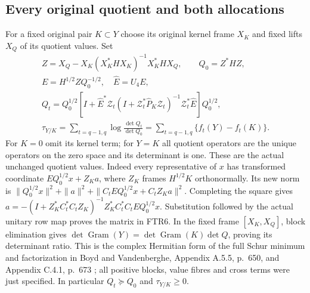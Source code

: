 \subsection{Every original quotient and both allocations}
For a fixed original pair $K\subset Y$ choose its original kernel
frame $X_K$ and fixed lifts $X_Q$ of its quotient values. Set
\[
\begin{gathered}
 Z=X_Q-X_K(X_K^*HX_K)^{-1}X_K^*HX_Q,\qquad Q_0=Z^*HZ,\\
 E=H^{1/2}ZQ_0^{-1/2},\quad \widehat E=U_4E,\\
 Q_t=Q_0^{1/2}\left[I+\widehat E^*\mathscr Z_t
 (I+\mathscr Z_t^*\widehat P_K\mathscr Z_t)^{-1}
                  \mathscr Z_t^*\widehat E\right]Q_0^{1/2},\\
 \tau_{Y/K}=\sum_{t=q-1,q}\log\frac{\det Q_t}{\det Q_0}
            =\sum_{t=q-1,q}\{f_t(Y)-f_t(K)\}.             \tag{FTR6}
\end{gathered}
\]
For $K=0$ omit its kernel term; for $Y=K$ all quotient operators
are the unique operators on the zero space and its determinant is
one. These are the actual unchanged quotient values. Indeed every
representative of $x$ has transformed coordinate
$EQ_0^{1/2}x+Z_Ka$, where $Z_K$ frames $H^{1/2}K$
orthonormally. Its new norm is
$\|Q_0^{1/2}x\|^2+\|a\|^2+
\|C_tEQ_0^{1/2}x+C_tZ_Ka\|^2$.
Completing the square gives
$a=-(I+Z_K^*C_t^*C_tZ_K)^{-1}Z_K^*C_t^*C_tEQ_0^{1/2}x$.
Substitution followed by the actual unitary row map proves the
matrix in FTR6. In the fixed frame $[X_K,X_Q]$, block elimination
gives $\det\operatorname{Gram}(Y)=
\det\operatorname{Gram}(K)\det Q$, proving its determinant ratio.
This is the complex Hermitian form of the full Schur minimum and
factorization in Boyd and Vandenberghe, Appendix A.5.5, p.~650,
and Appendix C.4.1, p.~673 \cite{human:boyd-vandenberghe}; all
positive blocks, value fibres and cross terms were just specified.
In particular $Q_t\succeq Q_0$ and $\tau_{Y/K}\ge0$.

